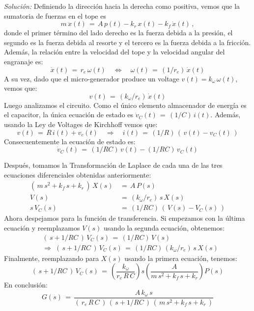 \documentclass[ a4paper, twoside, 11pt]{article}
\begin{document}
\begin{problem}
\emph{Soluci\'on:} Definiendo la direcci\'on hacia la derecha como positiva, vemos que la sumatoria de fuerzas en el tope es 
\begin{equation}
m \, \ddot{x}(t) \, = \, 
A \, p(t) - k_r \, x(t) - k_f \, \dot{x}(t) \, ,
\label{eq:mecanico}
\end{equation}
donde el primer t\'ermino del lado derecho es la fuerza debida a la presi\'on, el segundo es la fuerza debida al resorte y el tercero es la fuerza debida a la fricci\'on. Adem\'as, la relaci\'on entre la velocidad del tope y la velocidad angular del engranaje es: 
\[
\dot{x}(t) \, = \, r_e \, \omega(t) \quad \Longleftrightarrow \quad
\omega(t) \, = \, (1/r_e) \, \dot{x}(t)
\]
A su vez, dado que el micro-generador produce un voltage $v(t) = k_\omega \, \omega(t)$, vemos que: 
\begin{equation}
v(t) \, = \, (k_\omega/r_e) \, \dot{x}(t)
\label{eq:engranaje}
\end{equation}
Luego analizamos el circuito. Como el \'unico elemento almacenador de energ\'ia es el capacitor, la \'unica ecuaci\'on de estado es $\dot{v}_C(t) \, = \, (1/C) \, i(t)$. Adem\'as, usando la Ley de Voltages de Kirchhoff vemos que: 
\[
v(t) \, = \, R \, i(t) + v_c(t) \quad \Longrightarrow \quad
i(t) \, = \, (1/R) \, ( \, v(t) - v_C(t) \, )
\]
Consecuentemente la ecuaci\'on de estado es: 
\begin{equation}
\dot{v}_C(t) \, = \, (1/RC) \, v(t) - (1/RC) \, v_C(t)
\label{eq:electrico}
\end{equation}

Despu\'es, tomamos la Transformaci\'on de Laplace de cada una de las tres ecuaciones diferenciales obtenidas anteriormente: 
\begin{align}
( \, m \, s^2 + k_f \, s + k_r \, ) \, X(s) \, 
& = \, A \, P(s) \\
V(s) \, & = \, (k_\omega/r_e) \, s \, X(s) \\
s \, V_C(s) \, & = \, (1/RC) \, ( \, V(s) - V_C(s) \, )
\end{align}
Ahora despejamos para la funci\'on de transferencia. Si empezamos con la \'ultima ecuaci\'on y reemplazamos $V(s)$ usando la segunda ecuaci\'on, obtenemos: 
\begin{align*}
& ( \, s + 1/RC \, ) \, V_C(s) \, = \, (1/RC) \, V(s)  \\
& \Longrightarrow \;
( \, s + 1/RC \, ) \, V_C(s) \, = \, (1/RC) \, (k_\omega/r_e) \, s \, X(s)
\end{align*}
Finalmente, reemplazando para $X(s)$ usando la primera ecuaci\'on, tenemos: 
\[
( \, s + 1/RC \, ) \, V_C(s) \, = \,
\left( \frac{k_\omega}{r_e \, R \, C} \right) s \left( \frac{A}{m \, s^2 + k_f \, s + k_r} \right) P(s)
\]
En conclusi\'on: 
\[
G(s) \, = \, 
\frac{A \, k_\omega \, s}{ ( \, r_e \, R \, C \, ) \, ( \, s + 1/RC \, ) \, ( \, m \, s^2 + k_f \, s + k_r \, )}
\]

\end{problem}
\vspace{\baselineskip}
\end{document}
